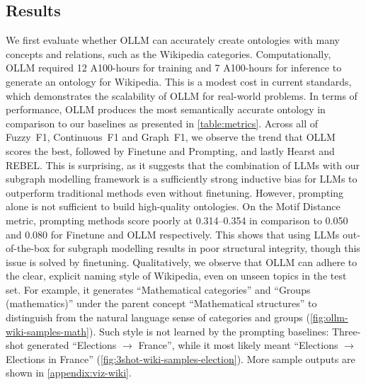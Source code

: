 \documentclass{article}
\newcommand{\name}{{OLLM}\xspace}
\begin{document}
\subsection{Results}  \label{sec:results}

%
We first evaluate whether \name can accurately create ontologies with many concepts and relations, such as the Wikipedia categories. Computationally, \name required 12 A100-hours for training and 7 A100-hours for inference to generate an ontology for Wikipedia. This is a modest cost in current standards, which demonstrates the scalability of \name for real-world problems.
In terms of performance, \name produces the most semantically accurate ontology in comparison to our baselines as presented in \cref{table:metrics}. Across all of Fuzzy~F1, Continuous~F1 and Graph~F1, we observe the trend that \name scores the best, followed by Finetune and Prompting, and lastly Hearst and REBEL. This is surprising, as it suggests that the combination of LLMs with our subgraph modelling framework is a sufficiently strong inductive bias for LLMs to outperform traditional methods even without finetuning. However, prompting alone is not sufficient to build high-quality ontologies.
On the Motif Distance metric, prompting methods score poorly at 0.314--0.354 in comparison to 0.050 and 0.080 for Finetune and \name respectively. This shows that using LLMs out-of-the-box for subgraph modelling results in poor structural integrity, though this issue is solved by finetuning.
Qualitatively, we observe that \name can adhere to the clear, explicit naming style of Wikipedia, even on unseen topics in the test set. For example, it generates ``Mathematical categories'' and ``Groups (mathematics)'' under the parent concept ``Mathematical structures'' to distinguish from the natural language sense of categories and groups (\cref{fig:ollm-wiki-samples-math}). Such style is not learned by the prompting baselines: Three-shot generated ``Elections $\to$ France'', while it most likely meant ``Elections $\to$ Elections in France'' (\cref{fig:3shot-wiki-samples-election}). More sample outputs are shown in \cref{appendix:viz-wiki}.

\end{document}
